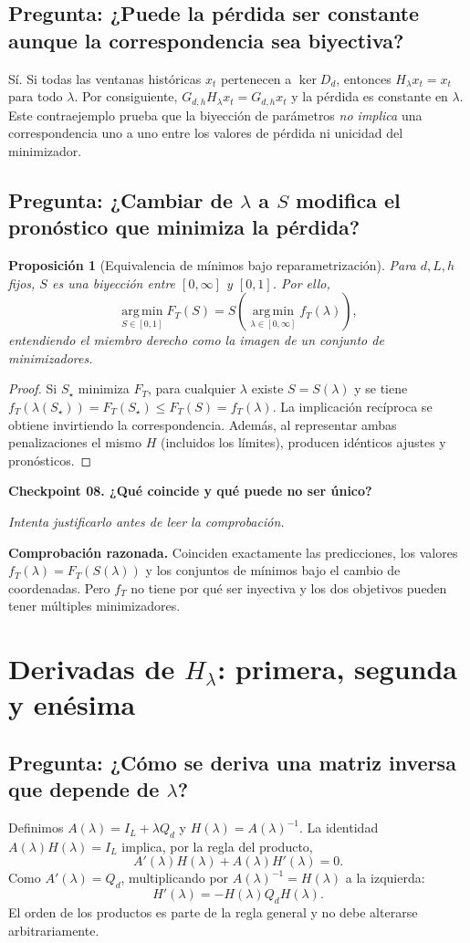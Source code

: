 \documentclass[11pt,letterpaper,parskip=half,headings=small]{scrartcl}
\newtheorem{proposicion}{Proposición}[section]
\theoremstyle{definition}\newtheorem{definicion}[proposicion]{Definición}
\theoremstyle{remark}\newtheorem{observacion}[proposicion]{Observación}
\newcommand{\argmin}{\operatorname*{arg\,min}}\newcommand{\diag}{\operatorname{diag}}
\newcommand{\pregunta}[1]{\subsection{Pregunta: #1}}
\newcommand{\checkpoint}[3]{%
  \par\medskip\noindent\textbf{\color{blue!45!black}Checkpoint #1. #2}\par
  \noindent\emph{Intenta justificarlo antes de leer la comprobación.}\par
  \noindent\textbf{Comprobación razonada. }#3\par\bigskip
}
\begin{document}
\pregunta{¿Puede la pérdida ser constante aunque la correspondencia sea biyectiva?}
Sí. Si todas las ventanas históricas $x_t$ pertenecen a $\ker D_d$,
entonces $H_\lambda x_t=x_t$ para todo $\lambda$. Por consiguiente,
$G_{d,h}H_\lambda x_t=G_{d,h}x_t$ y la pérdida es constante en $\lambda$.
Este contraejemplo prueba que la biyección de parámetros \emph{no implica}
una correspondencia uno a uno entre los valores de pérdida ni unicidad
del minimizador.

\pregunta{¿Cambiar de $\lambda$ a $S$ modifica el pronóstico que minimiza la pérdida?}
\begin{proposicion}[Equivalencia de mínimos bajo reparametrización]
Para $d,L,h$ fijos, $S$ es una biyección entre $[0,\infty]$ y $[0,1]$. Por ello,
\[
\argmin_{S\in[0,1]}F_T(S)
=S\!\left(\argmin_{\lambda\in[0,\infty]}f_T(\lambda)\right),
\]
entendiendo el miembro derecho como la imagen de un conjunto de minimizadores.
\end{proposicion}
\begin{proof}
Si $S_\star$ minimiza $F_T$, para cualquier $\lambda$ existe $S=S(\lambda)$ y se tiene
$f_T(\lambda(S_\star))=F_T(S_\star)\leq F_T(S)=f_T(\lambda)$. La implicación recíproca se obtiene invirtiendo la correspondencia. Además, al representar ambas penalizaciones el mismo $H$ (incluidos los límites), producen idénticos ajustes y pronósticos.
\end{proof}

\checkpoint{08}{¿Qué coincide y qué puede no ser único?}{Coinciden exactamente las predicciones, los valores $f_T(\lambda)=F_T(S(\lambda))$ y los conjuntos de mínimos bajo el cambio de coordenadas. Pero $f_T$ no tiene por qué ser inyectiva y los dos objetivos pueden tener múltiples minimizadores.}

\section{Derivadas de $H_\lambda$: primera, segunda y enésima}
\pregunta{¿Cómo se deriva una matriz inversa que depende de $\lambda$?}
Definimos $A(\lambda)=I_L+\lambda Q_d$ y $H(\lambda)=A(\lambda)^{-1}$. La identidad $A(\lambda)H(\lambda)=I_L$ implica, por la regla del producto,
\[
A'(\lambda)H(\lambda)+A(\lambda)H'(\lambda)=0.
\]
Como $A'(\lambda)=Q_d$, multiplicando por $A(\lambda)^{-1}=H(\lambda)$ a la izquierda:
\begin{equation}\label{eq:Hprime}
\boxed{H'(\lambda)=-H(\lambda)Q_dH(\lambda).}
\end{equation}
El orden de los productos es parte de la regla general y no debe alterarse arbitrariamente.
\end{document}
